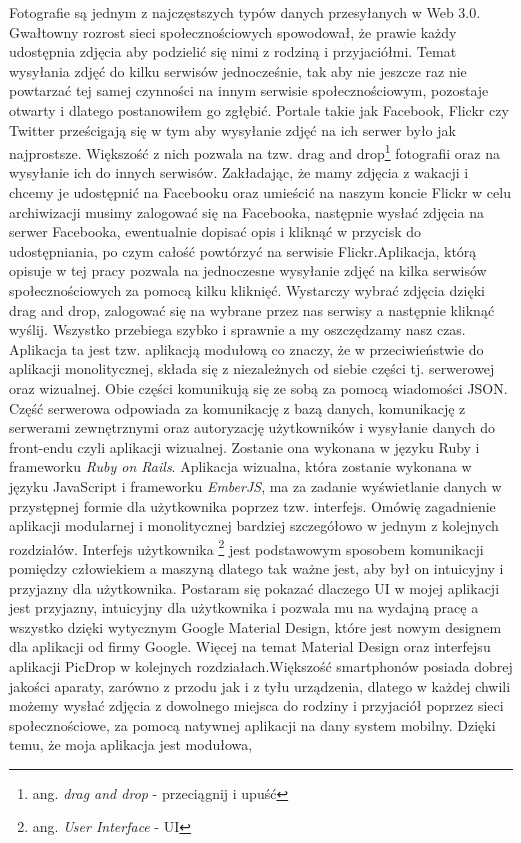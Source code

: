 \documentclass[brudnopis]{xmgr}
\begin{document}
\maketitle
%
\introduction
\indent Fotografie są jednym z najczęstszych typów danych przesyłanych w Web 3.0. Gwałtowny rozrost sieci społecznościowych spowodował, że prawie każdy udostępnia zdjęcia aby podzielić się nimi z rodziną i przyjaciółmi. Temat wysyłania zdjęć do kilku serwisów jednocześnie, tak aby nie jeszcze raz nie powtarzać tej samej czynności na innym serwisie społecznościowym, pozostaje otwarty i dlatego postanowiłem go zgłębić.
\newline\indent Portale takie jak Facebook, Flickr czy Twitter prześcigają się w tym aby wysyłanie zdjęć na ich serwer było jak najprostsze. Większość z nich pozwala na tzw. drag and drop\footnote{ang. \textit{drag and drop} - przeciągnij i upuść} fotografii oraz na wysyłanie ich do innych serwisów. Zakładając, że mamy zdjęcia z wakacji i chcemy je udostępnić na Facebooku oraz umieścić na naszym koncie Flickr w celu archiwizacji musimy zalogować się na Facebooka, następnie wysłać zdjęcia na serwer Facebooka, ewentualnie dopisać opis i kliknąć w przycisk do udostępniania, po czym całość powtórzyć na serwisie Flickr.Aplikacja, którą opisuje w tej pracy pozwala na jednoczesne wysyłanie zdjęć na kilka serwisów społecznościowych za pomocą kilku kliknięć. Wystarczy wybrać zdjęcia dzięki drag and drop, zalogować się na wybrane przez nas serwisy a następnie kliknąć wyślij. Wszystko przebiega szybko i sprawnie a my oszczędzamy nasz czas.  Aplikacja ta jest tzw. aplikacją modułową co znaczy, że w przeciwieństwie do aplikacji monolitycznej, składa się z  niezależnych od siebie części tj. serwerowej oraz wizualnej. Obie części komunikują się ze sobą za pomocą wiadomości JSON. Część serwerowa odpowiada za komunikację z bazą danych, komunikację z serwerami zewnętrznymi oraz autoryzację użytkowników i wysyłanie danych do front-endu czyli aplikacji wizualnej. Zostanie ona wykonana w języku Ruby i frameworku \textit{Ruby on Rails}.   Aplikacja wizualna, która zostanie wykonana w języku JavaScript i frameworku \textit{EmberJS}, ma za zadanie wyświetlanie danych w przystępnej formie dla użytkownika poprzez tzw. interfejs. Omówię zagadnienie aplikacji modularnej i monolitycznej bardziej szczegółowo w jednym z kolejnych rozdziałów. Interfejs użytkownika \footnote{ang. \textit{User Interface} - UI}  jest podstawowym sposobem komunikacji pomiędzy człowiekiem a maszyną dlatego tak ważne jest, aby był on intuicyjny i przyjazny dla użytkownika. Postaram się pokazać dlaczego UI w mojej aplikacji jest przyjazny, intuicyjny dla użytkownika i pozwala mu na wydajną pracę a wszystko dzięki wytycznym Google Material Design, które jest nowym designem dla aplikacji od firmy Google. Więcej na temat Material Design oraz interfejsu aplikacji PicDrop w kolejnych rozdziałach.\newline \indent Większość smartphonów posiada dobrej jakości aparaty, zarówno z przodu jak i z tyłu urządzenia, dlatego w każdej chwili możemy wysłać zdjęcia z dowolnego miejsca do rodziny i przyjaciół poprzez sieci społecznościowe, za pomocą natywnej aplikacji na dany system mobilny. Dzięki temu, że moja aplikacja jest modułowa, 
\end{document}
